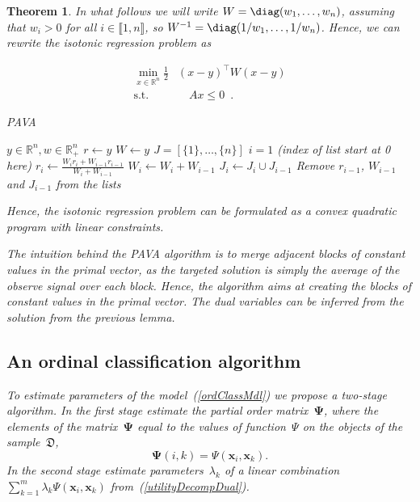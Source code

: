 \documentclass[12pt,preprint]{elsarticle}
\newcommand{\bx}{\mathbf{x}}
\newcommand{\bPsi}{\boldsymbol{\Psi}}
\newtheorem{Theorem}{Theorem}
\begin{document}
\begin{Theorem}
In what follows we will write $W=\diag(w_1,\dots,w_n)$, assuming that $w_i > 0$ for all $i \in \llbracket 1, n \rrbracket$, so $W^{-1}= \diag(1/w_1,\dots,1/w_n)$.
Hence, we can rewrite the isotonic regression problem as


\begin{align}
\min_{x \in \mathbb{R}^n}
\frac{1}{2}
& (x-y)^\top W (x-y) \\
\text{s.t.} & \quad Ax \leq 0 \enspace.
\end{align}

\begin{algorithm}[ht]
\caption{PAVA}\label{alg:cap}
\begin{algorithmic}
\Require $y \in\mathbb{R}^n, w \in \mathbb{R}^n_{+}$
\STATE $r \leftarrow y$
\STATE $W \leftarrow y$
\STATE $J = [\{1\},\dots, \{n\}]$ 
\STATE $i=1$ (index of list start at 0 here)
     
        \State $r_i \leftarrow \frac{W_i r_i + W_{i-1} r_{i-1}}{W_i + W_{i-1}}$
        \State $W_i \leftarrow W_i + W_{i-1}$
        \State $J_i \leftarrow J_i \cup J_{i-1}$
        \State Remove $r_{i-1}$, $W_{i-1}$ and $J_{i-1}$ from the lists
        \ENDIF
    \ELSE
    \ENDIF
\ENDWHILE
{}
\ENDFOR
{}
\end{algorithmic}
\end{algorithm}

Hence, the isotonic regression problem can be formulated as a convex quadratic program with linear constraints.

The intuition behind the PAVA algorithm is to merge adjacent blocks of constant values in the primal vector, as the targeted solution is simply the average of the observe signal over each block.
Hence, the algorithm aims at creating the blocks of constant values in the primal vector. The dual variables can be inferred from the  solution from the previous lemma.



\subsection{An ordinal classification algorithm}
To estimate parameters of the model~(\ref{ordClassMdl}) we propose a two-stage algorithm. In the first stage estimate the partial order matrix~$\bPsi$, where the elements of the matrix~$\bPsi$ equal to the values of function~$\Psi$ on the objects of the sample~$\mathfrak{D}$,
\[
\bPsi(i,k) = \Psi(\bx_i,\bx_k).
\]
In the second stage estimate parameters~$\lambda_k$ of a linear combination~$\sum\limits_{k=1}^m \lambda_{k} \Psi(\bx_i, \bx_k)$ from~(\ref{utilityDecompDual}).

\end{Theorem}
\end{document}
